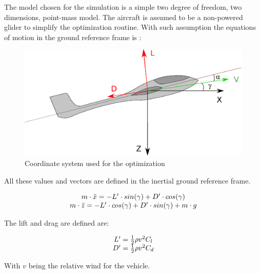 
The model chosen for the simulation is a simple two degree of freedom, two dimensions, point-mass model. 
The aircraft is assumed to be a non-powered glider to simplify the optimization routine. 
With such assumption the equations of motion in the ground reference frame is :

\begin{figure}[h]
  \centering
  \includegraphics{./Figures/glider.eps}
  \caption{Coordinate system used for the optimization}
\end{figure}

All these values and vectors are defined in the inertial ground reference frame.

\begin{equation}
\begin{array}[c]{c}
 m \cdot \ddot{x}= -L' \cdot sin(\gamma) + D' \cdot cos(\gamma) \\ 
 m \cdot \ddot{z}= -L' \cdot cos(\gamma) + D' \cdot sin(\gamma) + m \cdot g
\end{array}
\label{eqn:eqm}
\end{equation}



\par The lift and drag are defined are: 

\begin{equation}
\begin{array}[c]{c}
  L'= \frac{1}{2} \rho v^2 C_l \\ 
  D'= \frac{1}{2} \rho v^2 C_d 
\end{array}
\label{eqn:Cl_def}
\end{equation}

\par With $v$ being the relative wind for the vehicle.

